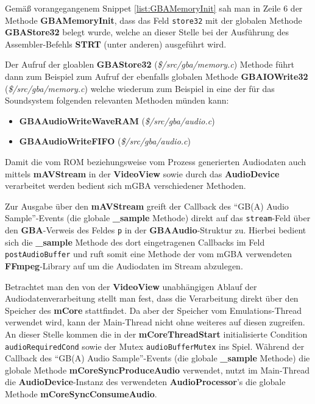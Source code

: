\documentclass[11pt,a4paper]{scrartcl}
\newcommand{\AutorDominik} {
    \vspace{-4mm}
    \large \textbf{Autor:} Dominik Scharnagl \normalsize
    \vspace{2mm}
}
\begin{document}
Gem\"a{\ss} vorangegangenem Snippet \ref{list:GBAMemoryInit} sah man in Zeile 6 der Methode \textbf{GBAMemoryInit}, dass das Feld \verb|store32| mit der globalen Methode \textbf{GBAStore32} belegt wurde, welche an dieser Stelle bei der Ausf\"uhrung des Assembler-Befehls \textbf{STRT} (unter anderen) ausgef\"uhrt wird.

Der Aufruf der gloablen \textbf{GBAStore32} (\textit{\$/src/gba/memory.c}) Methode f\"uhrt dann zum Beispiel zum Aufruf der ebenfalls globalen Methode \textbf{GBAIOWrite32} (\textit{\$/src/gba/memory.c}) welche wiederum zum Beispiel in eine der f\"ur das Soundsystem folgenden relevanten Methoden m\"unden kann:

\begin{itemize}
    \item \textbf{GBAAudioWriteWaveRAM} (\textit{\$/src/gba/audio.c})
    \item \textbf{GBAAudioWriteFIFO} (\textit{\$/src/gba/audio.c})
\end{itemize}


\newpage



Damit die vom ROM beziehungsweise vom Prozess generierten Audiodaten auch mittels \textbf{mAVStream} in der \textbf{VideoView} sowie durch das \textbf{AudioDevice} verarbeitet werden bedient sich mGBA verschiedener Methoden.

Zur Ausgabe \"uber den \textbf{mAVStream} greift der Callback des \enquote{GB(A) Audio Sample}-Events (die globale \textbf{{\_}sample} Methode) direkt auf das \verb|stream|-Feld \"uber den \textbf{GBA}-Verweis des Feldes \verb|p| in der \textbf{GBAAudio}-Struktur zu. Hierbei bedient sich die \textbf{{\_}sample} Methode des dort eingetragenen Callbacks im Feld \verb|postAudioBuffer| und ruft somit eine Methode der vom mGBA verwendeten \textbf{FFmpeg}-Library auf um die Audiodaten im Stream abzulegen.

Betrachtet man den von der \textbf{VideoView} unabh\"angigen Ablauf der Audiodatenverarbeitung stellt man fest, dass die Verarbeitung direkt \"uber den Speicher des \textbf{mCore} stattfindet. Da aber der Speicher vom Emulations-Thread verwendet wird, kann der Main-Thread nicht ohne weiteres auf diesen zugreifen. An dieser Stelle kommen die in der \textbf{mCoreThreadStart} initialisierte Condition \verb|audioRequiredCond| sowie der Mutex \verb|audioBufferMutex| ins Spiel. W\"ahrend der Callback des \enquote{GB(A) Audio Sample}-Events (die globale \textbf{{\_}sample} Methode) die globale Methode \textbf{mCoreSyncProduceAudio} verwendet, nutzt im Main-Thread die \textbf{AudioDevice}-Instanz des verwendeten \textbf{AudioProcessor}'s die globale Methode \textbf{mCoreSyncConsumeAudio}.
\end{document}
